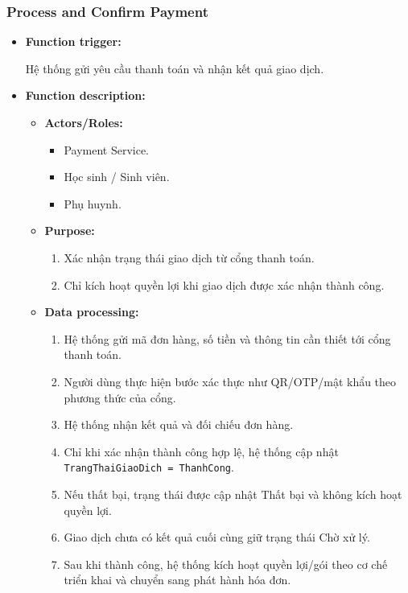 \documentclass[12pt,a4paper,oneside]{report}
\begin{document}
\subsubsection{Process and Confirm Payment}
\label{subsubsec:process-confirm-payment}

\begin{itemize}

    \item \textbf{Function trigger:}

    Hệ thống gửi yêu cầu thanh toán và nhận kết quả giao dịch.

    \item \textbf{Function description:}

    \begin{itemize}

        \item \textbf{Actors/Roles:}
        \begin{itemize}
            \item Payment Service.
            \item Học sinh / Sinh viên.
            \item Phụ huynh.
        \end{itemize}

        \item \textbf{Purpose:}
        \begin{enumerate}
            \item Xác nhận trạng thái giao dịch từ cổng thanh toán.
            \item Chỉ kích hoạt quyền lợi khi giao dịch được xác nhận thành công.
        \end{enumerate}

        \item \textbf{Data processing:}
        \begin{enumerate}
            \item Hệ thống gửi mã đơn hàng, số tiền và thông tin cần thiết tới cổng thanh toán.
            \item Người dùng thực hiện bước xác thực như QR/OTP/mật khẩu theo phương thức của cổng.
            \item Hệ thống nhận kết quả và đối chiếu đơn hàng.
            \item Chỉ khi xác nhận thành công hợp lệ, hệ thống cập nhật \texttt{TrangThaiGiaoDich = ThanhCong}.
            \item Nếu thất bại, trạng thái được cập nhật Thất bại và không kích hoạt quyền lợi.
            \item Giao dịch chưa có kết quả cuối cùng giữ trạng thái Chờ xử lý.
            \item Sau khi thành công, hệ thống kích hoạt quyền lợi/gói theo cơ chế triển khai và chuyển sang phát hành hóa đơn.
        \end{enumerate}


\end{itemize}
\end{itemize}
\end{document}
